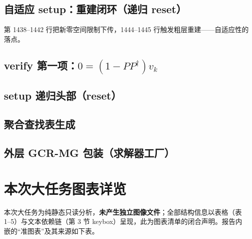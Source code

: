 \documentclass[UTF8]{ctexart}
\begin{document}
\subsection{自适应 setup：重建闭环（递归 reset）}


第 1438--1442 行把新零空间限制下传，1444--1445 行触发粗层重建——自适应性的落点。

\subsection{verify 第一项：$0=(1-PP^\dagger)v_k$}


\subsection{setup 递归头部（reset）}


\subsection{聚合查找表生成}


\subsection{外层 GCR-MG 包装（求解器工厂）}


\section{本次大任务图表详览}

本次大任务为纯静态只读分析，\textbf{未产生独立图像文件}；全部结构信息以表格（表 1--5）与文本依赖链（第 3 节 keybox）呈现，此为图表清单的闭合声明。报告内嵌的``准图表''及其来源如下表。
\end{document}
